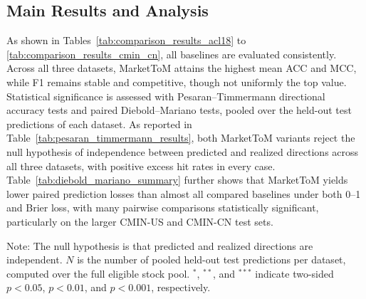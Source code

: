 \documentclass[a4paper,fleqn,doubleblind]{cas-sc}
\begin{document}
\subsection{Main Results and Analysis}
As shown in Tables~\ref{tab:comparison_results_acl18} to \ref{tab:comparison_results_cmin_cn}, all baselines are evaluated consistently. Across all three datasets, MarketToM attains the highest mean ACC and MCC, while F1 remains stable and competitive, though not uniformly the top value. Statistical significance is assessed with Pesaran--Timmermann directional accuracy tests and paired Diebold--Mariano tests, pooled over the held-out test predictions of each dataset. As reported in Table~\ref{tab:pesaran_timmermann_results}, both MarketToM variants reject the null hypothesis of independence between predicted and realized directions across all three datasets, with positive excess hit rates in every case. Table~\ref{tab:diebold_mariano_summary} further shows that MarketToM yields lower paired prediction losses than almost all compared baselines under both 0--1 and Brier loss, with many pairwise comparisons statistically significant, particularly on the larger CMIN-US and CMIN-CN test sets.

\begin{table}[htbp]
\centering
\small
\renewcommand{\arraystretch}{0.85}
\caption{Pesaran--Timmermann directional accuracy tests for MarketToM.}
\begin{flushleft}
\footnotesize Note: The null hypothesis is that predicted and realized directions are independent. $N$ is the number of pooled held-out test predictions per dataset, computed over the full eligible stock pool. $^{*}$, $^{**}$, and $^{***}$ indicate two-sided $p<0.05$, $p<0.01$, and $p<0.001$, respectively.
\end{flushleft}
\label{tab:pesaran_timmermann_results}
\end{table}
\end{document}
